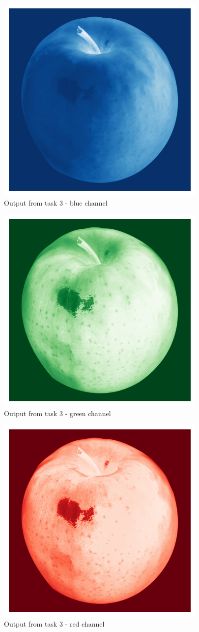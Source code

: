 \documentclass[conference]{IEEEtran} %
\begin{document}
\begin{figure}[H]
    \centering
    \includegraphics[width=0.5\linewidth]{Task3Output/blue2.png}
    \caption{Output from task 3 - blue channel}
    \label{fig:blue2}
\end{figure}

\begin{figure}[H]
    \centering
    \includegraphics[width=0.5\linewidth]{Task3Output/green2.png}
    \caption{Output from task 3 - green channel}
    \label{fig:green2}
\end{figure}

\begin{figure}[H]
    \centering
    \includegraphics[width=0.5\linewidth]{Task3Output/red2.png}
    \caption{Output from task 3 - red channel}
    \label{fig:red2}
\end{figure}
\end{document}
